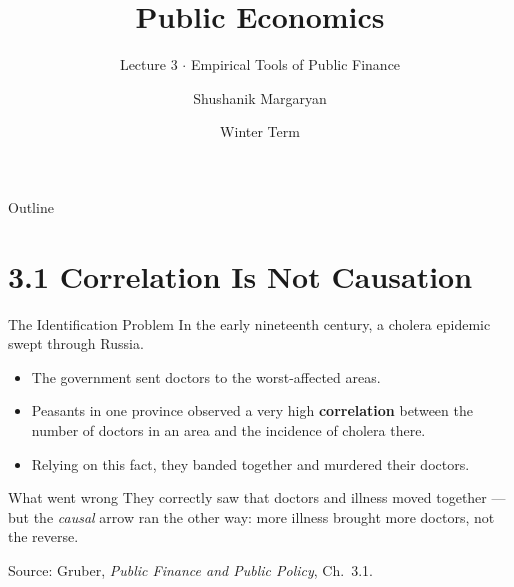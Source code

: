 \documentclass[11pt,aspectratio=169]{beamer}
\title{Public Economics}
\subtitle{Lecture 3 \(\cdot\) Empirical Tools of Public Finance}
\author{Shushanik Margaryan}
\institute{WU Vienna University of Economics and Business}
\date{Winter Term}
\newcommand{\srcnote}[1]{{\footnotesize\color{wugray}Source: #1}}
\begin{document}
\begin{frame}
  \titlepage
\end{frame}

 

\begin{frame}{Outline}
  \tableofcontents
\end{frame}

\section{3.1 Correlation Is Not Causation}

\begin{frame}{The Identification Problem}
  In the early nineteenth century, a cholera epidemic swept through Russia.
  \begin{itemize}
    \item The government sent doctors to the worst-affected areas.
    \item Peasants in one province observed a very high \textbf{correlation} between the number of doctors in an area and the incidence of cholera there.
    \item Relying on this fact, they banded together and murdered their doctors.
  \end{itemize}
  \vspace{0.5em}
  \begin{alertblock}{What went wrong}
    They correctly saw that doctors and illness moved together --- but the \emph{causal} arrow ran the other way: more illness brought more doctors, not the reverse.
  \end{alertblock}
  \srcnote{Gruber, \emph{Public Finance and Public Policy}, Ch.\ 3.1.}
\end{frame}
\end{document}
